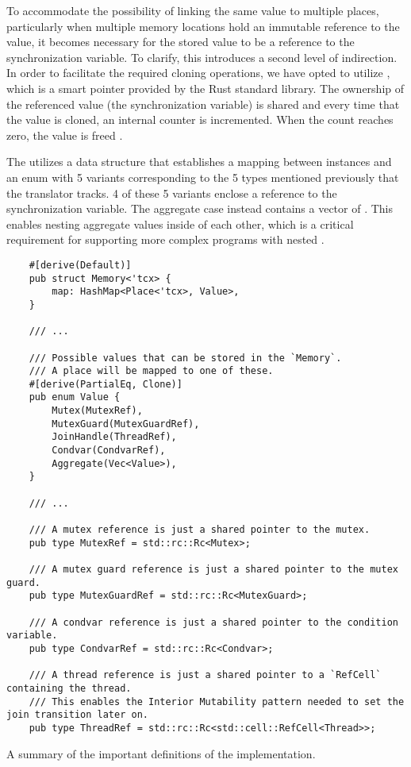 To accommodate the possibility of linking the same value to multiple places,
particularly when multiple memory locations hold an immutable reference to the value,
it becomes necessary for the stored value to be a reference to the synchronization variable.
To clarify, this introduces a second level of indirection.
In order to facilitate the required cloning operations,
we have opted to utilize ,
which is a smart pointer provided by the Rust standard library.
The ownership of the referenced value (the synchronization variable) is shared
and every time that the value is cloned, an internal counter is incremented.
When the count reaches zero, the value is freed \cite[Chap. 15.4]{rust-book}.

The  utilizes a  data structure
that establishes a mapping between  instances and
an enum with 5 variants corresponding to
the 5 types mentioned previously that the translator tracks.
4 of these 5 variants enclose a 
reference to the synchronization variable.
The aggregate case instead contains a vector of .
This enables nesting aggregate values inside of each other,
which is a critical requirement for supporting more complex programs with nested .

\begin{listing}[!htb]
  \begin{verbatim}
    #[derive(Default)]
    pub struct Memory<'tcx> {
        map: HashMap<Place<'tcx>, Value>,
    }

    /// ...

    /// Possible values that can be stored in the `Memory`.
    /// A place will be mapped to one of these.
    #[derive(PartialEq, Clone)]
    pub enum Value {
        Mutex(MutexRef),
        MutexGuard(MutexGuardRef),
        JoinHandle(ThreadRef),
        Condvar(CondvarRef),
        Aggregate(Vec<Value>),
    }

    /// ...
    
    /// A mutex reference is just a shared pointer to the mutex.
    pub type MutexRef = std::rc::Rc<Mutex>;

    /// A mutex guard reference is just a shared pointer to the mutex guard.
    pub type MutexGuardRef = std::rc::Rc<MutexGuard>;

    /// A condvar reference is just a shared pointer to the condition variable.
    pub type CondvarRef = std::rc::Rc<Condvar>;

    /// A thread reference is just a shared pointer to a `RefCell` containing the thread.
    /// This enables the Interior Mutability pattern needed to set the join transition later on.
    pub type ThreadRef = std::rc::Rc<std::cell::RefCell<Thread>>;
  \end{verbatim}
  \caption{A summary of the important definitions of the  implementation.}
  \label{lst:memory-implementation}
\end{listing}

